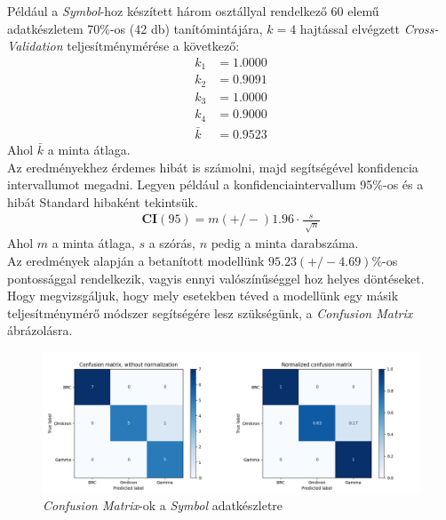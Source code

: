 Például a \textit{Symbol}-hoz készített három osztállyal rendelkező 60 elemű adatkészletem 70\%-os (42 db) tanítómintájára, $k=4$ hajtással elvégzett \textit{Cross-Validation} teljesítménymérése a következő:
\begin{align*}
	k_1 &= 1.0000\\
	k_2 &= 0.9091\\
	k_3 &= 1.0000\\
	k_4 &= 0.9000\\
	\bar{k} &= 0.9523
\end{align*}
Ahol $\bar{k}$ a minta átlaga.\\
Az eredményekhez érdemes hibát is számolni, majd segítségével konfidencia intervallumot megadni. Legyen például a konfidenciaintervallum 95\%-os és a hibát Standard hibaként tekintsük.
\begin{align*}
	\boldsymbol{CI}(95) = m (+/-) 1.96 \cdot \frac{s}{\sqrt[]{n}}
\end{align*}
Ahol $m$ a minta átlaga, $s$ a szórás, $n$ pedig a minta darabszáma.\\
Az eredmények alapján a betanított modellünk $95.23 (+/- 4.69)$\%-os pontossággal rendelkezik, vagyis ennyi valószínűséggel hoz helyes döntéseket. Hogy megvizsgáljuk, hogy mely esetekben téved a modellünk egy másik teljesítménymérő módszer segítségére lesz szükségünk, a \textit{Confusion Matrix} ábrázolásra.


\begin{figure}[h]
\centering
\includegraphics[width=\textwidth]{images/symbol_confusion.png}
\caption{\textit{Confusion Matrix}-ok a \textit{Symbol} adatkészletre}
\label{fig:confusionm}
\end{figure}

